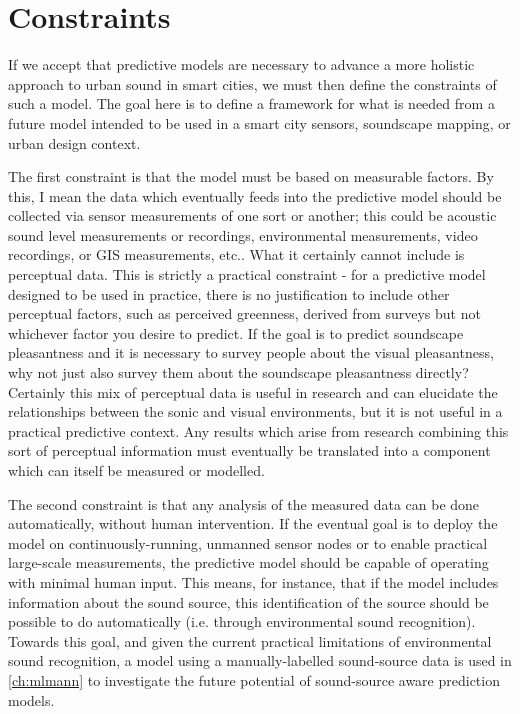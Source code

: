 \section{Constraints}
\label{sec:modelConstraints}
If we accept that predictive models are necessary to advance a more holistic approach to urban sound in smart cities, we must then define the constraints of such a model. The goal here is to define a framework for what is needed from a future model intended to be used in a smart city sensors, soundscape mapping, or urban design context.

The first constraint is that the model must be based on measurable factors. By this, I mean the data which eventually feeds into the predictive model should be collected via sensor measurements of one sort or another; this could be acoustic sound level measurements or recordings, environmental measurements, video recordings, or GIS measurements, etc.. What it certainly cannot include is perceptual data. This is strictly a practical constraint - for a predictive model designed to be used in practice, there is no justification to include other perceptual factors, such as perceived greenness, derived from surveys but not whichever factor you desire to predict. If the goal is to predict soundscape pleasantness and it is necessary to survey people about the visual pleasantness, why not just also survey them about the soundscape pleasantness directly? Certainly this mix of perceptual data is useful in research and can elucidate the relationships between the sonic and visual environments, but it is not useful in a practical predictive context. Any results which arise from research combining this sort of perceptual information must eventually be translated into a component which can itself be measured or modelled.

The second constraint is that any analysis of the measured data can be done automatically, without human intervention. If the eventual goal is to deploy the model on continuously-running, unmanned sensor nodes or to enable practical large-scale measurements, the predictive model should be capable of operating with minimal human input. This means, for instance, that if the model includes information about the sound source, this identification of the source should be possible to do automatically (i.e. through environmental sound recognition). Towards this goal, and given the current practical limitations of environmental sound recognition, a model using a manually-labelled sound-source data is used in \cref{ch:mlmann} to investigate the future potential of sound-source aware prediction models.

